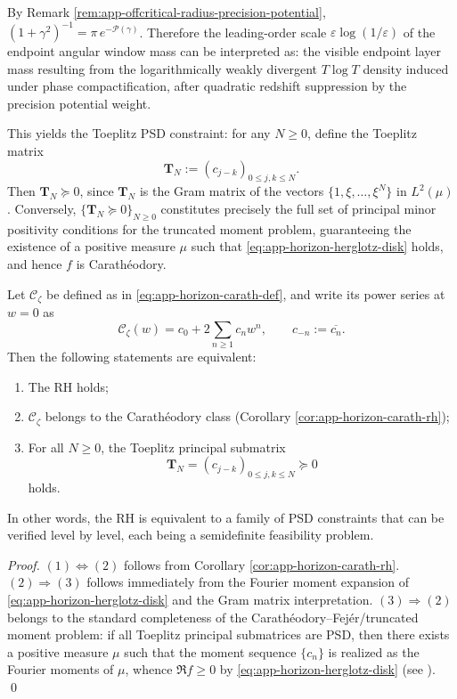 \begin{remark}\label{rem:app-horizon-endpoint-window-mass-precision-potential}
By Remark \ref{rem:app-offcritical-radius-precision-potential},
\(
(1+\gamma^2)^{-1}=\pi\,e^{-\mathcal{P}(\gamma)}
\).
Therefore the leading-order scale \(\varepsilon\log(1/\varepsilon)\) of the endpoint angular window mass can be interpreted as: the visible endpoint layer mass resulting from the logarithmically weakly divergent \(T\log T\) density induced under phase compactification, after quadratic redshift suppression by the precision potential weight.
\end{remark}

This yields the Toeplitz PSD constraint: for any \(N\ge 0\), define the Toeplitz matrix
\[
\mathbf{T}_N:=(c_{j-k})_{0\le j,k\le N}.
\]
Then \(\mathbf{T}_N\succeq 0\), since \(\mathbf{T}_N\) is the Gram matrix of the vectors \(\{1,\xi,\dots,\xi^N\}\) in \(L^2(\mu)\).
Conversely, \(\{\mathbf{T}_N\succeq 0\}_{N\ge 0}\) constitutes precisely the full set of principal minor positivity conditions for the truncated moment problem, guaranteeing the existence of a positive measure \(\mu\) such that \eqref{eq:app-horizon-herglotz-disk} holds, and hence \(f\) is Carath\'eodory.

\begin{theorem}\label{thm:app-horizon-toeplitz-lmi}
Let \(\mathscr{C}_{\zeta}\) be defined as in \eqref{eq:app-horizon-carath-def}, and write its power series at \(w=0\) as
\[
\mathscr{C}_{\zeta}(w)=c_0+2\sum_{n\ge 1}c_n w^n,\qquad c_{-n}:=\overline{c_n}.
\]
Then the following statements are equivalent:\vspace{-2pt}
\begin{enumerate}
  \item The RH holds;
  \item \(\mathscr{C}_{\zeta}\) belongs to the Carath\'eodory class (Corollary \ref{cor:app-horizon-carath-rh});
  \item For all \(N\ge 0\), the Toeplitz principal submatrix
  \[
  \boxed{\;\mathbf{T}_N=(c_{j-k})_{0\le j,k\le N}\succeq 0\;}
  \]
  holds.
\end{enumerate}
In other words, the RH is equivalent to a family of PSD constraints that can be verified level by level, each being a semidefinite feasibility problem.
\end{theorem}

\begin{proof}
\((1)\Leftrightarrow(2)\) follows from Corollary \ref{cor:app-horizon-carath-rh}.
\((2)\Rightarrow(3)\) follows immediately from the Fourier moment expansion of \eqref{eq:app-horizon-herglotz-disk} and the Gram matrix interpretation.
\((3)\Rightarrow(2)\) belongs to the standard completeness of the Carath\'eodory--Fej\'er/truncated moment problem: if all Toeplitz principal submatrices are PSD, then there exists a positive measure \(\mu\) such that the moment sequence \(\{c_n\}\) is realized as the Fourier moments of \(\mu\), whence \(\Re f\ge 0\) by \eqref{eq:app-horizon-herglotz-disk} (see \cite{Duren1970TheoryHp,Simon2005OPUC1}). \qed
\end{proof}

